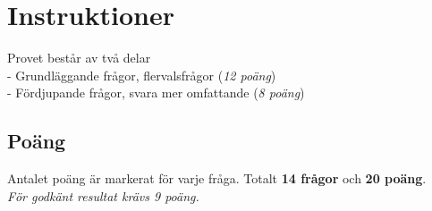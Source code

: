 \documentclass{exam}
\begin{document}
\section*{Instruktioner}
Provet består av två delar \\
    - Grundläggande frågor, flervalsfrågor (\textit{12 poäng})\\
    - Fördjupande frågor, svara mer omfattande (\textit{8 poäng})

\subsection*{Poäng}
Antalet poäng är markerat för varje fråga. Totalt \textbf{14 frågor} och \textbf{20 poäng}.\\ \textit{För godkänt resultat krävs 9 poäng.}
\end{document}
